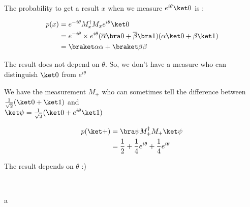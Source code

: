 ~

The probability to get a result $x$ when we measure $e^{i\theta} \ket 0$ is :

\begin{align*}
  p(x) &= e^{-i\theta } M_x^\dagger M_x e^{i\theta}\ket 0 \\
  &= e^{-i\theta}\times e^{i\theta}(\overline\alpha \bra 0 + \overline\beta \bra 1)
      (\alpha \ket 0 + \beta \ket 1) \\
  &= \braket \alpha \alpha + \braket \beta \beta
\end{align*}

The result does not depend on $\theta$. So, we don't have a measure who can
distinguish $\ket 0$ from $e^{i\theta}$

We have the measurement $M_+$ who can sometimes tell the difference between
$\frac{1}{\sqrt 2}(\ket 0 + \ket 1)$ and \\
$\ket \psi = \frac{1}{\sqrt 2}(\ket 0 + e^{i\theta}\ket 1)$

\begin{align*}
  p(\ket +) &= \bra \psi M_+^\dagger M_+ \ket \psi \\
  &= \frac 1 2 + \frac 1 4 e^{i\theta} + \frac 1 4 e^{i\theta}
\end{align*}

The result depends on $\theta$ :)

~

a

